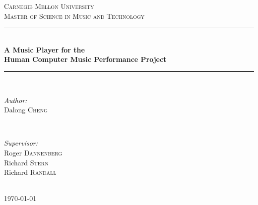 \documentclass[12pt]{Latex/Classes/PhDthesisPSnPDF}
\begin{document}
\begin{titlepage}

\newcommand{\HRule}{\rule{\linewidth}{0.5mm}} %

\center %

\textsc{\LARGE Carnegie Mellon University}\\[1.5cm] %
\textsc{\Large Master of Science in Music and Technology}\\[0.5cm] %

\HRule \\[0.4cm]
{\large \bfseries A Music Player for the \\ Human Computer Music Performance Project}\\[0.4cm] %
\HRule \\[1.5cm]

\begin{minipage}{0.4\textwidth}
\begin{flushleft} \large
\emph{Author:}\\
Dalong \textsc{Cheng} %
\end{flushleft}
\end{minipage}
~
\begin{minipage}{0.4\textwidth}
\begin{flushright} \large
\emph{Supervisor:} \\
Roger \textsc{Dannenberg} \\ %
Richard \textsc{Stern} \\
Richard \textsc{Randall}
\end{flushright}
\end{minipage}\\[4cm]

{\large \today}\\[3cm] %


\vfill %

\end{titlepage}
\end{document}
